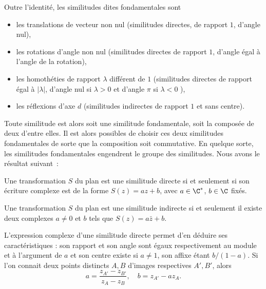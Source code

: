 Outre l'identité, les similitudes dites fondamentales sont
\begin{itemize}
\item les translations de vecteur non nul (similitudes directes, de rapport $1$, d'angle nul),
\item les rotations d'angle non nul (similitudes directes de rapport $1$, d'angle égal à l'angle de la rotation),
\item les homothéties de rapport $\lambda$ différent de $1$ (similitudes directes de rapport égal à $|\lambda|$, d'angle nul si $\lambda>0$ et d'angle $\pi$ si $\lambda<0$ ),
\item les réflexions d'axe $d$ (similitudes indirectes de rapport $1$ et sans centre). 
\end{itemize}
Toute similitude est alors soit une similitude fondamentale, soit la composée de deux d'entre elles. Il est alors possibles de choisir ces deux similitudes fondamentales de sorte que la composition soit commutative. En quelque sorte, les similitudes fondamentales engendrent le groupe des similitudes. Nous avons le résultat suivant~:
\begin{fthm}
Une transformation $S$ du plan est une similitude directe si et seulement si son écriture complexe est de la forme $S(z)=az+b$, avec $a \in \C^\ast$, $b \in \C$ fixés.

Une transformation $S$ du plan est une similitude indirecte si et seulement il existe deux complexes $a \neq 0$ et $b$ tels que $S(z)=a \bar{z} + b$.
\end{fthm}

L'expression complexe d'une similitude directe permet d'en déduire ses caractéristiques : son rapport et son angle sont égaux respectivement au module et à l'argument de $a$ et son centre existe si $a \neq 1$, son affixe étant $b/(1-a)$. Si l'on connait deux points distincts $A, B$ d'images respectives $A', B'$, alors 
\[a= \frac{z_{A'}- z_{B'}}{z_{A}-z_{B}}, \quad b=z_{A'} - a z_{A}.\]






